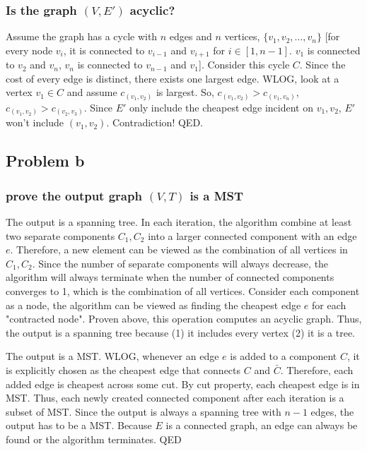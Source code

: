 \documentclass{article}
\begin{document}
\subsubsection{Is the graph $(V,E')$ acyclic?}
Assume the graph has a cycle with $n$ edges and $n$ vertices, $\{v_1, v_2, ..., v_n\}$ [for every node $v_i$, it is connected to $v_{i-1}$ and $v_{i+1}$ for $i \in [1,n-1]$. $v_1$ is connected to $v_2$ and $v_n$, $v_n$ is connected to $v_{n-1}$ and $v_1$]. Consider this cycle $C$. Since the cost of every edge is distinct, there exists one largest edge. WLOG, look at a vertex $v_1 \in C$ and assume $c_{(v_1, v_2)}$ is largest. So, $c_{(v_1, v_2)} > c_{(v_1, v_n)}$, $c_{(v_1, v_2)} > c_{(v_2, v_3)}$. Since $E'$ only include the cheapest edge incident on $v_1, v_2$, $E'$ won't include $(v_1,v_2)$. Contradiction! QED. 




\subsection{Problem b}
\subsubsection{prove the output graph $(V,T)$ is a MST}
The output is a spanning tree. In each iteration, the algorithm combine at least two separate components $C_1, C_2$ into a larger connected component with an edge $e$. Therefore, a new element can be viewed as the combination of all vertices in $C_1, C_2$. Since the number of separate components will always decrease, the algorithm will always terminate when the number of connected components converges to 1, which is the combination of all vertices. Consider each component as a node, the algorithm can be viewed as finding the cheapest edge $e$ for each "contracted node". Proven above, this operation computes an acyclic graph. Thus, the output is a spanning tree because (1) it includes every vertex (2) it is a tree.

The output is a MST. WLOG, whenever an edge $e$ is added to a component $C$, it is explicitly chosen as the cheapest edge that connects $C$ and $\bar C$.   Therefore, each added edge is cheapest across some cut. By cut property, each cheapest edge is in MST. Thus, each newly created connected component after each iteration is a subset of MST. Since the output is always a spanning tree with $n-1$ edges, the output has to be a MST. Because $E$ is a connected graph, an edge can always be found or the algorithm terminates. QED
\end{document}
